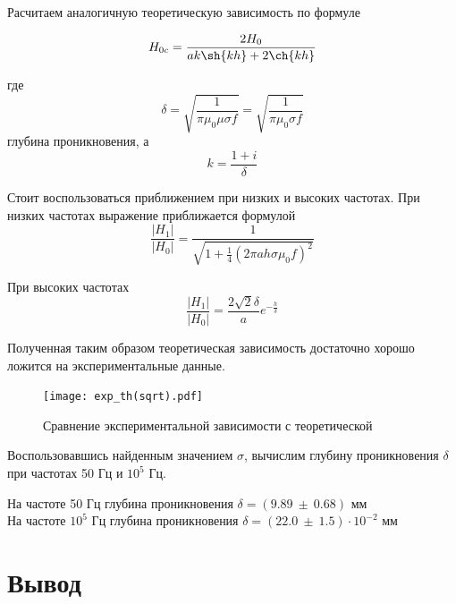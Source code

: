     Расчитаем аналогичную теоретическую зависимость по формуле

    \begin{equation}
        H_{0c} = \frac{2 H_0}{a k \sh{k h} + 2 \ch{k h}}
    \end{equation}

    где
    \begin{equation}
        \delta = \sqrt{\frac{1}{\pi \mu_0 \mu \sigma f}} = \sqrt{\frac{1}{\pi \mu_0 \sigma f}}
    \end{equation}
    глубина проникновения, а
    \begin{equation}
       k = \frac{1 + i}{\delta} 
    \end{equation}

    Стоит воспользоваться приближением при низких и высоких частотах. 
    При низких частотах выражение приближается формулой 
    \begin{equation}
        \frac{|H_1|}{|H_0|} = \frac{1}{\sqrt{1 + \frac{1}{4} (2 \pi a h \sigma \mu_0 f)^2}}
    \end{equation}

    При высоких частотах 
    \begin{equation}
        \frac{|H_1|}{|H_0|} = \frac{2 \sqrt{2} \delta}{a} e^{-\frac{h}{\delta}}
    \end{equation}

    Полученная таким образом теоретическая зависимость достаточно хорошо ложится на экспериментальные данные.

    \begin{figure}
        \centering
        \texttt{[image: exp\_th(sqrt).pdf]}
        \caption{Сравнение экспериментальной зависимости с теоретической}
        \label{exp_th(sqrt)}
    \end{figure}

    Воспользовавшись найденным значением $\sigma$, вычислим глубину проникновения $\delta$ при частотах 50 Гц и $10^5$ Гц.

    \begin{center}
        На частоте 50 Гц глубина проникновения $\delta = (9.89 ~ \pm ~ 0.68)$ мм \\
        На частоте $10^5$ Гц глубина проникновения $\delta = (22.0 ~ \pm ~ 1.5) \cdot 10^{-2}$ мм
    \end{center}

	\section*{Вывод}

	
    
